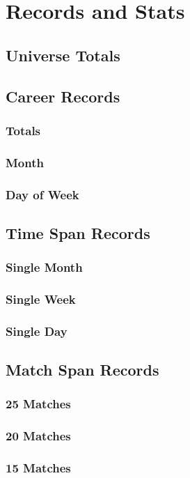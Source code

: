 \part{Records and Stats}
  \chapter{Universe Totals}
  \chapter{Career Records}
    \section{Totals}
      
    \section{Month}
    \section{Day of Week}
  \chapter{Time Span Records}
    \section{Single Month}
    \section{Single Week}
    \section{Single Day}
  \chapter{Match Span Records}
    \section{25 Matches}
    \section{20 Matches}
    \section{15 Matches}
